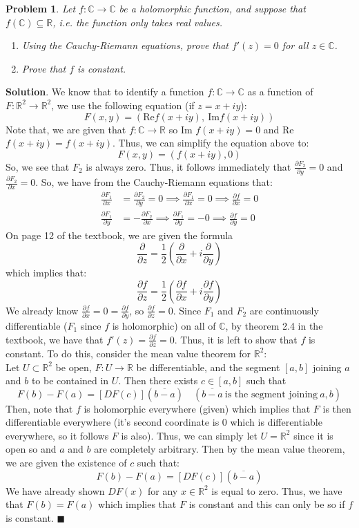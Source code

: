 \documentclass[12pt]{article}
\newcommand{\pd}[2]{\frac{\partial #1}{\partial #2}}
\renewcommand{\=}[1]{\stackrel{#1}{=}} %
\providecommand{\RR}{\mathbb{R}}
\newtheorem{p}{Problem}[section]
\theoremstyle{definition}
\newenvironment{s}{%
        \begin{trivlist} \item \textbf{Solution}. }{%
            \hspace*{\fill} $\blacksquare$\end{trivlist}}%
\begin{document}
\begin{p}
    Let $f: \mathbb{C}\to\mathbb{C}$ be a holomorphic function, and suppose that $f(\mathbb{C})\subseteq\RR$, i.e.
    the function only takes real values.
    \begin{enumerate}
        \item Using the Cauchy-Riemann equations, prove that $f'(z) = 0$ for all $z\in\mathbb{C}$.
        \item Prove that $f$ is constant.
    \end{enumerate}
\end{p}
\begin{s}
    We know that to identify a function $f: \mathbb{C} \to \mathbb{C}$ as a function of $F:\RR^2\to\RR^2$, we use
    the following equation (if $z = x+iy$):
    \[ F(x,y) = (\text{Re}f(x+iy),\:\text{Im}f(x+iy)) \]
    Note that, we are given that $f:\mathbb{C}\to\RR$ so Im $f(x+iy) = 0$ and Re $f(x+iy) = f(x+iy)$.
    Thus, we can simplify the equation above to:
    \[ F(x,y) = (f(x+iy), 0)\]
    So, we see that $F_2$ is always zero. Thus, it follows immediately that $\pd{F_2}{y} = 0$ and $\pd{F_2}{x} = 0$.
    So, we have from the Cauchy-Riemann equations that:
    \begin{align*}
        \pd{F_1}{x} &= \pd{F_2}{y} = 0 \implies \pd{F_1}{x} = 0 \implies \pd{f}{x} = 0\\
        \pd{F_1}{y} &= -\pd{F_2}{x} \implies \pd{F_1}{y} = -0 \implies \pd{f}{y} = 0
    \end{align*}
    On page 12 of the textbook, we are given the formula
    \[ \pd{}{z} = \frac{1}{2}(\pd{}{x}+i\pd{}{y}) \]
    which implies that:
    \[ \pd{f}{z} = \frac{1}{2}(\pd{f}{x}+i\pd{f}{y}) \]
    We already know $\pd{f}{x} = 0 = \pd{f}{y}$, so $\pd{f}{z} = 0$. Since $F_1$ and $F_2$ are continuously differentiable
    ($F_1$ since $f$ is holomorphic) on all of $\mathbb{C}$, by theorem 2.4 in the textbook, we have that $f'(z) = \pd{f}{z} = 0$.
    Thus, it is left to show that $f$ is constant. To do this, consider the mean value theorem for $\RR^2$: \\
    Let $U\subset\RR^2$ be open, $F: U\to\RR$ be differentiable, and the segment $[a,b]$ joining $a$ and $b$ to be contained in $U$.
    Then there exists $c\in[a,b]$ such that \[ F(b) - F(a) = [DF(c)](\overline{b-a})\quad(\overline{b-a}\:\text{is the segment joining}\:a,b) \]
    Then, note that $f$ is holomorphic everywhere (given) which implies that $F$ is then differentiable everywhere (it's second coordinate
    is 0 which is differentiable everywhere, so it follows $F$ is also). Thus, we can simply let $U = \RR^2$ since it is open so and $a$ and
    $b$ are completely arbitrary. Then by the mean value theorem, we are given the existence of $c$ such that:
    \[ F(b) - F(a) = [DF(c)](\overline{b-a}) \]
    We have already shown $DF(x)$ for any $x\in\RR^2$ is equal to zero. Thus, we have that $F(b) = F(a)$ which implies that $F$ is constant
    and this can only be so if $f$ is constant.
\end{s}
\end{document}
